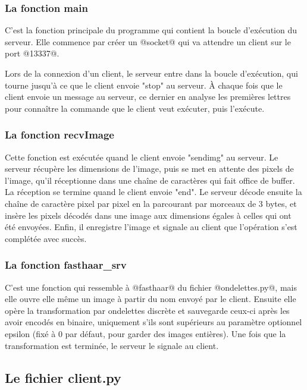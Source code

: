 \documentclass{article}
\begin{document}
\subsubsection{La fonction main}

C'est la fonction principale du programme qui contient la boucle d'exécution du serveur. Elle commence par créer un @socket@ qui va attendre un client sur le port @13337@.

Lors de la connexion d'un client, le serveur entre dans la boucle d'exécution, qui tourne jusqu'à ce que le client envoie "stop" au serveur. À chaque fois que le client envoie un message au serveur, ce dernier en analyse les premières lettres pour connaître la commande que le client veut exécuter, puis l'exécute.

\subsubsection{La fonction recvImage}

Cette fonction est exécutée quand le client envoie "sendimg" au serveur. Le serveur récupère les dimensions de l'image, puis se met en attente des pixels de l'image, qu'il réceptionne dans une chaîne de caractères qui fait office de buffer. La réception se termine quand le client envoie "end". Le serveur décode ensuite la chaîne de caractère pixel par pixel en la parcourant par morceaux de 3 bytes, et insère les pixels décodés dans une image aux dimensions égales à celles qui ont été envoyées. Enfin, il enregistre l'image et signale au client que l'opération s'est complétée avec succès.

\subsubsection{La fonction fasthaar_srv}

C'est une fonction qui ressemble à @fasthaar@ du fichier @ondelettes.py@, mais elle ouvre elle même un image à partir du nom envoyé par le client. Ensuite elle opère la transformation par ondelettes discrète et sauvegarde ceux-ci après les avoir encodés en binaire, uniquement s'ils sont supérieurs au paramètre optionnel epsilon (fixé à 0 par défaut, pour garder des images entières). Une fois que la transformation est terminée, le serveur le signale au client.

\subsection{Le fichier client.py}
\end{document}
